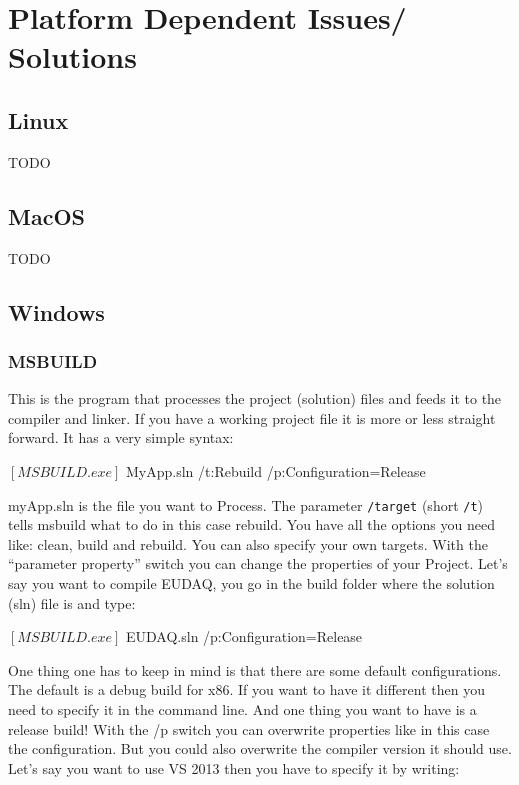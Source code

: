 \section{Platform Dependent Issues/ Solutions}
\label{app:platform}
\subsection{Linux}
TODO
\subsection{MacOS}
TODO
\subsection{Windows}
\subsubsection{MSBUILD}

This is the program that processes the project (solution) files and feeds it to the compiler and linker. If you have a working project file it is more or less straight forward. It has a very simple syntax:

      \begin{listing}[mybash]
$[MSBUILD.exe]$ MyApp.sln /t:Rebuild /p:Configuration=Release
\end{listing}

myApp.sln is the file you want to Process. The parameter
\texttt{/target} (short \texttt{/t}) tells msbuild what to do in this
case rebuild. You have all the options you need like: clean, build and
rebuild. You can also specify your own targets. With the ``parameter
property'' switch you can change the properties of your Project. Let's
say you want to compile EUDAQ, you go in the build folder where the solution (sln) file is and type:

      \begin{listing}[mybash]
$[MSBUILD.exe]$ EUDAQ.sln /p:Configuration=Release 
\end{listing}

One thing one has to keep in mind is that there are some default
configurations. The default is a debug build for x86. If you want to
have it different then you need to specify it in the command line. And
one thing you want to have is a release build! With the /p switch you
can overwrite properties like in this case the configuration. But you
could also overwrite the compiler version it should use. Let's say you
want to use VS 2013 then you have to specify it by writing:

